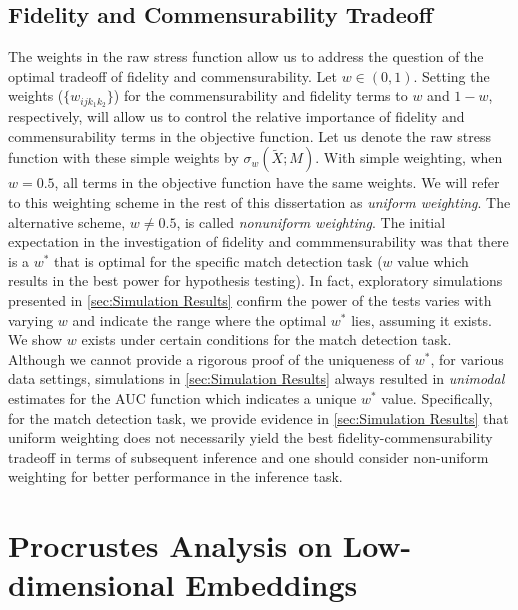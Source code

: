 \documentclass[12pt,oneside,final]{thesis}\usepackage[]{graphicx}\usepackage[]{color}
\begin{document}
\section{Fidelity and Commensurability Tradeoff}
 The weights in the raw stress function allow us to address the question of the optimal tradeoff of  fidelity and commensurability. Let $w \in (0,1)$. Setting the weights ($\{w_{ijk_1k_2}\}$)  for the commensurability  and fidelity  terms    to $w$ and $1-w$, respectively,  will allow us to control the relative importance of fidelity and commensurability terms in the objective function. Let us denote the raw stress function with these simple weights by $\sigma_w(\widetilde{X};M)$.  With simple weighting, when $w=0.5$, all terms in the objective function have the same weights. We will refer to this weighting scheme in the rest of this dissertation as \emph{uniform weighting}. The alternative scheme, $w \neq 0.5$, is called \emph{nonuniform weighting}.
The initial  expectation in the investigation of fidelity and commmensurability was that there is a $w^*$ that is optimal for the specific match detection task ($w$ value which results in the best power for hypothesis testing). In fact,  exploratory simulations presented in \ref{sec:Simulation Results}  confirm the power of the tests varies with varying $w$ and indicate the range where the optimal  $w^*$ lies, assuming it exists. We show $w$ exists under certain conditions for the match detection task. Although we cannot provide  a rigorous proof of the uniqueness of $w^*$, for various data settings, simulations in \ref{sec:Simulation Results} always resulted in \emph{unimodal}  estimates for the AUC function which indicates a unique $w^*$ value.
Specifically,  for the match detection task, we provide evidence in \ref{sec:Simulation Results} that  uniform weighting does not necessarily yield the best fidelity-commensurability tradeoff in terms of subsequent inference and one should consider non-uniform weighting for better performance in the inference task.






\chapter{Procrustes Analysis on Low-dimensional Embeddings}
\label{chap:PoM}
\end{document}
